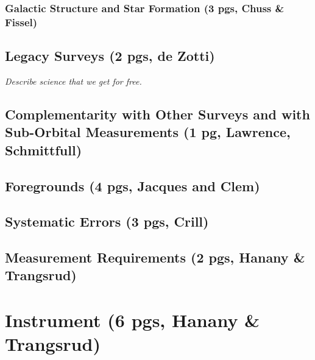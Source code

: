 \documentclass[12pt]{article}
\begin{document}
\subsubsection{Galactic Structure and Star Formation (3 pgs, Chuss \& Fissel)}




\subsection{Legacy Surveys (2 pgs, de Zotti)} 

{\it Describe science that we get for free. }




\subsection{Complementarity with Other Surveys and with Sub-Orbital Measurements (1 pg, Lawrence, Schmittfull)} 




\subsection{Foregrounds (4 pgs, Jacques and Clem)}




\subsection{Systematic Errors (3 pgs, Crill)}




\subsection{Measurement Requirements (2 pgs, Hanany \& Trangsrud)}





\section{Instrument (6 pgs, Hanany \& Trangsrud)}
\end{document}
